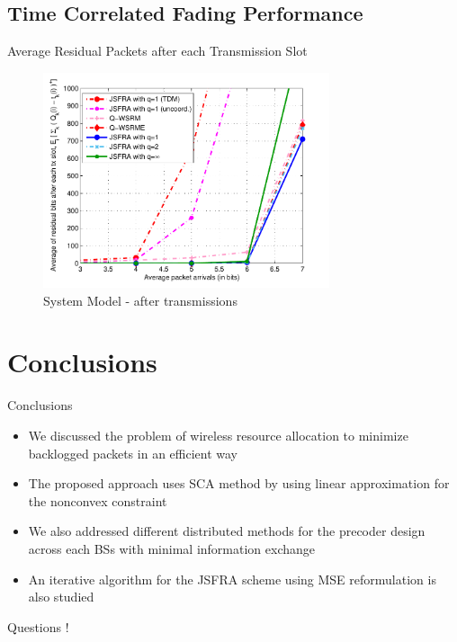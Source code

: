 \documentclass[10pt]{beamer}
\begin{document}
\subsection{Time Correlated Fading Performance}

\begin{frame}{Average Residual Packets after each Transmission Slot}
	\begin{figure}
		\centering
		\includegraphics[width=0.75\textwidth]{average_queue_over_time-3}
		\caption{System Model -  after  transmissions}
	\end{figure}
\end{frame}

\section{Conclusions}

\begin{frame}{Conclusions}
\begin{itemize}
\item We discussed the problem of wireless resource allocation to minimize backlogged packets in an efficient way
\item The proposed approach uses \ac{SCA} method by using linear approximation for the nonconvex constraint
\item We also addressed different distributed methods for the precoder design across each \acsp{BS} with minimal information exchange
\item An iterative algorithm for the \acs{JSFRA} scheme using \acs{MSE} reformulation is also studied
\end{itemize}
\end{frame}


\begin{frame}
\begin{center}
{\color{blue}\Huge{Questions !}}
\end{center}
\end{frame}
\end{document}
